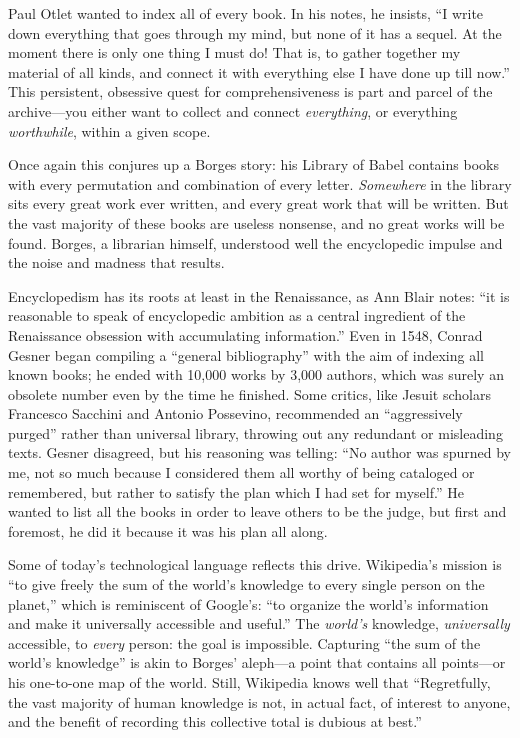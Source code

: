 Paul Otlet wanted to index all of every book. In his notes, he insists, ``I write down everything that goes through my mind, but none of it has a sequel. At the moment there is only one thing I must do! That is, to gather together my material of all kinds, and connect it with everything else I have done up till now.''\autocite[20]{reagle_good_2010} This persistent, obsessive quest for comprehensiveness is part and parcel of the archive---you either want to collect and connect \emph{everything}, or everything \emph{worthwhile}, within a given scope.

Once again this conjures up a Borges story: his Library of Babel contains books with every permutation and combination of every letter. \emph{Somewhere} in the library sits every great work ever written, and every great work that will be written. But the vast majority of these books are useless nonsense, and no great works will be found. Borges, a librarian himself, understood well the encyclopedic impulse and the noise and madness that results.\autocite[112-118]{borges_collected_1999}

Encyclopedism has its roots at least in the Renaissance, as Ann Blair notes: ``it is reasonable to speak of encyclopedic ambition as a central ingredient of the Renaissance obsession with accumulating information.''\autocite[``Information Management in Comparative Perspective'']{blair_too_2010} Even in 1548, Conrad Gesner began compiling a ``general bibliography'' with the aim of indexing all known books; he ended with 10,000 works by 3,000 authors, which was surely an obsolete number even by the time he finished.\autocite[93]{burke_social_2000} Some critics, like Jesuit scholars Francesco Sacchini and Antonio Possevino, recommended an ``aggressively purged'' rather than universal library, throwing out any redundant or misleading texts. Gesner disagreed, but his reasoning was telling: ``No author was spurned by me, not so much because I considered them all worthy of being cataloged or remembered, but rather to satisfy the plan which I had set for myself.''\autocite[``Bibliographies'']{blair_too_2010} He wanted to list all the books in order to leave others to be the judge, but first and foremost, he did it because it was his plan all along.

Some of today's technological language reflects this drive. Wikipedia's mission is ``to give freely the sum of the world's knowledge to every single person on the planet,''\autocite[18]{reagle_good_2010} which is reminiscent of Google's: ``to organize the world's information and make it universally accessible and useful.''\autocite{``Company Overview,'' Google, http://google.com/about/company} The \emph{world's} knowledge, \emph{universally} accessible, to \emph{every} person: the goal is impossible. Capturing ``the sum of the world's knowledge'' is akin to Borges' aleph---a point that contains all points---or his one-to-one map of the world. Still, Wikipedia knows well that ``Regretfully, the vast majority of human knowledge is not, in actual fact, of interest to anyone, and the benefit of recording this collective total is dubious at best.''\autocite[17]{reagle_good_2010}

